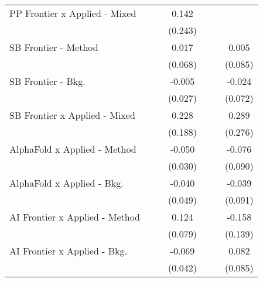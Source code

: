 \begin{tabular}{lcccccc}
   PP Frontier x Applied - Mixed  &               &               & 0.142         &              &              &   \\   
                                  &               &               & (0.243)       &              &              &   \\   
   SB Frontier - Method           &               &               & 0.017         &              &              & 0.005\\   
                                  &               &               & (0.068)       &              &              & (0.085)\\   
   SB Frontier - Bkg.             &               &               & -0.005        &              &              & -0.024\\   
                                  &               &               & (0.027)       &              &              & (0.072)\\   
   SB Frontier x Applied - Mixed  &               &               & 0.228         &              &              & 0.289\\   
                                  &               &               & (0.188)       &              &              & (0.276)\\   
   AlphaFold x Applied - Method   &               &               & -0.050        &              &              & -0.076\\   
                                  &               &               & (0.030)       &              &              & (0.090)\\   
   AlphaFold x Applied - Bkg.     &               &               & -0.040        &              &              & -0.039\\   
                                  &               &               & (0.049)       &              &              & (0.091)\\   
   AI Frontier x Applied - Method &               &               & 0.124         &              &              & -0.158\\   
                                  &               &               & (0.079)       &              &              & (0.139)\\   
   AI Frontier x Applied - Bkg.   &               &               & -0.069        &              &              & 0.082\\   
                                  &               &               & (0.042)       &              &              & (0.085)\\   

\end{tabular}
